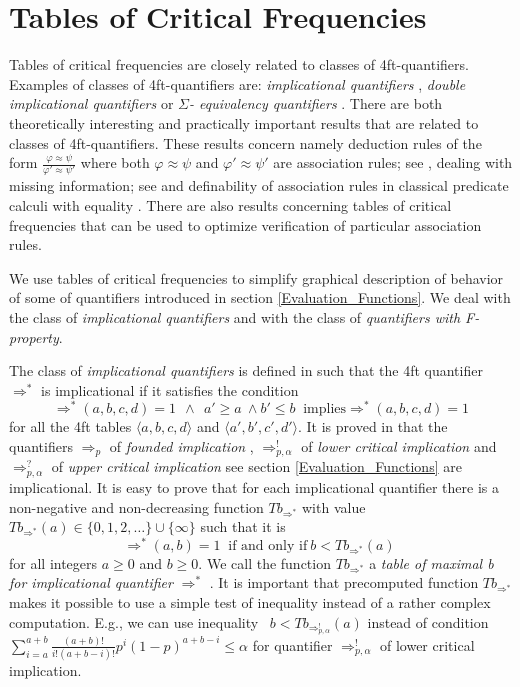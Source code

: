 \section{Tables of Critical Frequencies} \label{Classes_Tables}

Tables of critical frequencies are closely related to classes of 4ft-quantifiers.  
Examples of classes of 4ft-quantifiers are: {\em implicational quantifiers} \cite{Ha:78}, 
{\em double implicational quantifiers} \cite{Ra:05A}
or {\em $\Sigma$- equivalency quantifiers} \cite{Ra:05A}. 
There are both theoretically interesting and practically important results 
that are related to classes of 4ft-quantifiers. These results concern
namely deduction rules  of the form  $ \frac{\varphi \approx \psi}{\varphi' \approx \psi'} $
where both $ \varphi \approx \psi $ and 
$ \varphi' \approx \psi' $ are association rules; see \cite{Ra:05A}, dealing with missing information; 
see \cite{Ha:78,Ra:98A} and definability of association rules in classical predicate calculi 
with equality \cite{Ra:04}. There are also results concerning tables of critical frequencies that 
can be used to optimize verification of particular association rules. 

We use tables of critical frequencies to simplify graphical description 
of behavior of some of quantifiers introduced in section 
\ref{Evaluation_Functions}. We deal with the class of {\em implicational quantifiers}
and with the class of {\em quantifiers with F-property}.  

The class of {\em implicational quantifiers} is defined in \cite{Ha:78} such that 
the 4ft quantifier $ \Rightarrow^*  $ is implicational if it satisfies the condition 
%
$$ \Rightarrow^*(a,b,c,d) = 1   \ \ \land \ \ a' \geq a \  \land b' \leq b \ \mbox{ implies} \Rightarrow^*(a,b,c,d)  = 1 $$
%
for all the 4ft tables $ \langle a,b,c,d \rangle $   and $ \langle a',b',c',d'\rangle $.
It is proved in \cite{Ha:78}  that the quantifiers 
 $ \Rightarrow_{p} $ of {\it founded implication \/},  $ \Rightarrow^{!}_{p, \alpha} $ of
 {\it lower critical implication} and 
 $ \Rightarrow^{?}_{p, \alpha} $ of
 {\it upper critical implication} see section 
 \ref{Evaluation_Functions} are implicational. 
It is easy to prove that for each implicational quantifier there is a 
non-negative and non-decreasing function
$ Tb_{\Rightarrow^{*}}$ with value
\mbox{ $ Tb_{\Rightarrow^{*}}(a) \in  \{ 0,1,2, \dots \} \cup \{ \infty \}$}
such that it is 
$$ \Rightarrow^{*}(a,b) = 1  \ \mbox{ if and only if}  \ b <  Tb_{\Rightarrow^{*}}(a) \  $$
for all integers $ a \geq 0$ and $ b \geq 0 $.
We call the function $Tb_{\Rightarrow^{*}}$
a {\it table of maximal b for implicational quantifier \/} $\Rightarrow^{*}$ \cite{Ha:78,Ra:98A}.
It is important that precomputed function $Tb_{\Rightarrow^{*}}$
makes it possible to use a simple test of inequality
instead of a rather complex computation. E.g.,  we can use inequality
\mbox{ $ b < Tb_{\Rightarrow^{!}_{p, \alpha}}(a) $}
instead of condition \mbox{ $ \sum_{i = a}^{a + b} \frac{(a+b)!}{i!(a+b-i)!}
          p^{i} (1 - p)^{a+b-i} \leq \alpha $}
for quantifier
$ \Rightarrow^{!}_{p, \alpha} $ of lower critical implication. 

